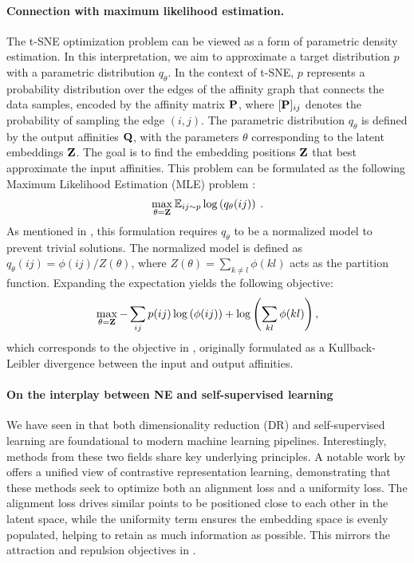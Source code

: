 \paragraph{Connection with maximum likelihood estimation.}
The t-SNE optimization problem can be viewed as a form of parametric density estimation. In this interpretation, we aim to approximate a target distribution $p$ with a parametric distribution $q_{\theta}$. In the context of t-SNE, $p$ represents a probability distribution over the edges of the affinity graph that connects the data samples, encoded by the affinity matrix ${\mathbf{P}}$, where $[{\mathbf{P}}]_{ij}$ denotes the probability of sampling the edge $(i,j)$. The parametric distribution $q_{\theta}$ is defined by the output affinities ${\mathbf{Q}}$, with the parameters $\theta$ corresponding to the latent embeddings ${\mathbf{Z}}$. The goal is to find the embedding positions ${\mathbf{Z}}$ that best approximate the input affinities. This problem can be formulated as the following Maximum Likelihood Estimation (MLE) problem \citep{damrich2022t}:
\begin{align}
    \max_{\theta = {\mathbf{Z}}} \mathbb{E}_{ij \sim p} \log \left( q_{\theta}(ij) \right) \:.
\end{align}
As mentioned in , this formulation requires $q_{\theta}$ to be a normalized model to prevent trivial solutions. The normalized model is defined as $q_{\theta}(ij) = \phi(ij) / Z(\theta)$, where $Z(\theta) = \sum_{k \neq l} \phi(kl)$ acts as the partition function. Expanding the expectation yields the following objective:
\begin{align}
    \max_{\theta = {\mathbf{Z}}}  - \sum_{ij} p(ij) \log \left( \phi(ij) \right) + \log \left( \sum_{kl} \phi(kl) \right),
\end{align}
which corresponds to the objective in , originally formulated as a Kullback-Leibler divergence between the input and output affinities.


\paragraph{On the interplay between NE and self-supervised learning} We have seen in  that both dimensionality reduction (DR) and self-supervised learning are foundational to modern machine learning pipelines. Interestingly, methods from these two fields share key underlying principles. A notable work by \citet{wang2020understanding} offers a unified view of contrastive representation learning, demonstrating that these methods seek to optimize both an alignment loss and a uniformity loss. The alignment loss drives similar points to be positioned close to each other in the latent space, while the uniformity term ensures the embedding space is evenly populated, helping to retain as much information as possible. This mirrors the attraction and repulsion objectives in .

